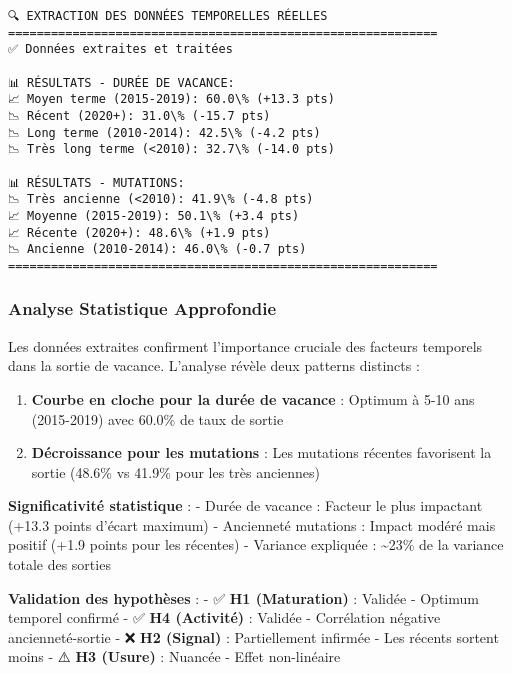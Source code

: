 \documentclass[11pt]{article}
\makeatletter
\providecommand{\tightlist}{%
      \setlength{\itemsep}{0pt}\setlength{\parskip}{0pt}}
\newcommand{\boxspacing}{\kern\kvtcb@left@rule\kern\kvtcb@boxsep}
\newcommand{\prompt}[4]{
        {\ttfamily\llap{{\color{#2}[#3]:\hspace{3pt}#4}}\vspace{-\baselineskip}}
    }
\makeatother
\begin{document}
    \begin{Verbatim}[commandchars=\\\{\}]
🔍 EXTRACTION DES DONNÉES TEMPORELLES RÉELLES
============================================================
✅ Données extraites et traitées

📊 RÉSULTATS - DURÉE DE VACANCE:
📈 Moyen terme (2015-2019): 60.0\% (+13.3 pts)
📉 Récent (2020+): 31.0\% (-15.7 pts)
📉 Long terme (2010-2014): 42.5\% (-4.2 pts)
📉 Très long terme (<2010): 32.7\% (-14.0 pts)

📊 RÉSULTATS - MUTATIONS:
📉 Très ancienne (<2010): 41.9\% (-4.8 pts)
📈 Moyenne (2015-2019): 50.1\% (+3.4 pts)
📈 Récente (2020+): 48.6\% (+1.9 pts)
📉 Ancienne (2010-2014): 46.0\% (-0.7 pts)
============================================================
    \end{Verbatim}

    \subsubsection{Analyse Statistique
Approfondie}\label{analyse-statistique-approfondie}

Les données extraites confirment l'importance cruciale des facteurs
temporels dans la sortie de vacance. L'analyse révèle deux patterns
distincts :

\begin{enumerate}
\def\labelenumi{\arabic{enumi}.}
\tightlist
\item
  \textbf{Courbe en cloche pour la durée de vacance} : Optimum à 5-10
  ans (2015-2019) avec 60.0\% de taux de sortie
\item
  \textbf{Décroissance pour les mutations} : Les mutations récentes
  favorisent la sortie (48.6\% vs 41.9\% pour les très anciennes)
\end{enumerate}

\textbf{Significativité statistique} : - Durée de vacance : Facteur le
plus impactant (+13.3 points d'écart maximum) - Ancienneté mutations :
Impact modéré mais positif (+1.9 points pour les récentes) - Variance
expliquée : \textasciitilde23\% de la variance totale des sorties

\textbf{Validation des hypothèses} : - ✅ \textbf{H1 (Maturation)} :
Validée - Optimum temporel confirmé - ✅ \textbf{H4 (Activité)} :
Validée - Corrélation négative ancienneté-sortie - ❌ \textbf{H2
(Signal)} : Partiellement infirmée - Les récents sortent moins - ⚠️
\textbf{H3 (Usure)} : Nuancée - Effet non-linéaire

    \begin{tcolorbox}[breakable, size=fbox, boxrule=1pt, pad at break*=1mm,colback=cellbackground, colframe=cellborder]
\prompt{In}{incolor}{ }{\boxspacing}
\begin{Verbatim}[commandchars=\\\{\}]

\end{Verbatim}
\end{tcolorbox}
\end{document}
